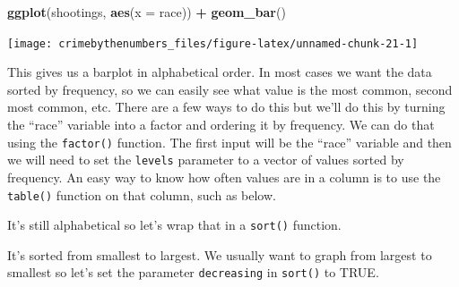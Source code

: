 \documentclass[
  12pt,
]{book}
\newenvironment{Shaded}{\begin{snugshade}}{\end{snugshade}}
\newcommand{\CommentTok}[1]{\textcolor[rgb]{0.37,0.37,0.37}{\textit{#1}}}
\newcommand{\DataTypeTok}[1]{\textcolor[rgb]{0.27,0.27,0.27}{#1}}
\newcommand{\KeywordTok}[1]{\textcolor[rgb]{0.27,0.27,0.27}{\textbf{#1}}}
\newcommand{\NormalTok}[1]{#1}
\newcommand{\OperatorTok}[1]{\textcolor[rgb]{0.43,0.43,0.43}{\textbf{#1}}}
\newcommand{\StringTok}[1]{\textcolor[rgb]{0.5,0.5,0.5}{#1}}
\begin{document}
\begin{Shaded}
\begin{Highlighting}[]
\KeywordTok{ggplot}\NormalTok{(shootings, }\KeywordTok{aes}\NormalTok{(}\DataTypeTok{x =}\NormalTok{ race)) }\OperatorTok{+}\StringTok{ }
\StringTok{  }\KeywordTok{geom\_bar}\NormalTok{()}
\end{Highlighting}
\end{Shaded}

\begin{center}\texttt{[image: crimebythenumbers\_files/figure-latex/unnamed-chunk-21-1]} \end{center}

This gives us a barplot in alphabetical order. In most cases we want the data sorted by frequency, so we can easily see what value is the most common, second most common, etc. There are a few ways to do this but we'll do this by turning the ``race'' variable into a factor and ordering it by frequency. We can do that using the \texttt{factor()} function. The first input will be the ``race'' variable and then we will need to set the \texttt{levels} parameter to a vector of values sorted by frequency. An easy way to know how often values are in a column is to use the \texttt{table()} function on that column, such as below.

\begin{Shaded}
\end{Shaded}

It's still alphabetical so let's wrap that in a \texttt{sort()} function.

\begin{Shaded}
\end{Shaded}

It's sorted from smallest to largest. We usually want to graph from largest to smallest so let's set the parameter \texttt{decreasing} in \texttt{sort()} to TRUE.
\end{document}
